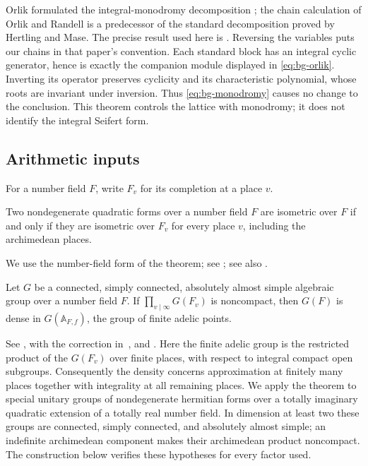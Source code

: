 Orlik formulated the integral-monodromy decomposition
\cite{Orlik1972}; the chain calculation of Orlik and Randell
\cite{OrlikRandell1977} is a predecessor of the standard decomposition
proved by Hertling and Mase. The precise result used here is
\cite[Theorem~1.3(a), (c), (d), and Definition~2.6]{HertlingMase2022}.
Reversing the variables puts our chains in that paper's convention.
Each standard block has an integral cyclic generator, hence is exactly
the companion module displayed in \eqref{eq:bg-orlik}.  Inverting its
operator preserves cyclicity and its characteristic
polynomial, whose roots are invariant under inversion.  Thus \eqref{eq:bg-monodromy} causes no change
to the conclusion.  This theorem controls the lattice with monodromy;
it does not identify the integral Seifert form.

\subsection{Arithmetic inputs}

For a number field $F$, write $F_v$ for its completion at a place $v$.

\begin{theorem}\label{bg:hasse}
Two nondegenerate quadratic forms over a number field $F$ are isometric
over $F$ if and only if they are isometric over $F_v$ for every place
$v$, including the archimedean places.
\end{theorem}

We use the number-field form of the theorem; see
\cite[Theorem~25.64(c) and the following discussion]{Milne2022};
see also \cite[Chapter~VI]{OMeara1963}.

\begin{theorem}\label{bg:approximation}
Let $G$ be a connected, simply connected, absolutely almost simple
algebraic group over a number field $F$.  If
$\prod_{v\mid\infty}G(F_v)$ is noncompact, then $G(F)$ is dense in
$G(\mathbb A_{F,f})$, the group of finite adelic points.
\end{theorem}

See \cite[Theorem~A, p.~1140]{Platonov1969}, with the correction
in~\cite{Platonov1970}, and
\cite[Theorem~2.3, p.~281]{Rapinchuk2014}.
Here the finite adelic group is the restricted product of the $G(F_v)$
over finite places, with respect to integral compact open subgroups.
Consequently the density concerns approximation at finitely many
places together with integrality at all remaining places.
We apply the theorem to special unitary groups of nondegenerate
hermitian forms over a totally imaginary quadratic extension of a
totally real number field.  In dimension at least two these groups are
connected, simply connected, and absolutely almost simple; an
indefinite archimedean component makes their archimedean product
noncompact.  The construction below verifies these hypotheses for
every factor used.

